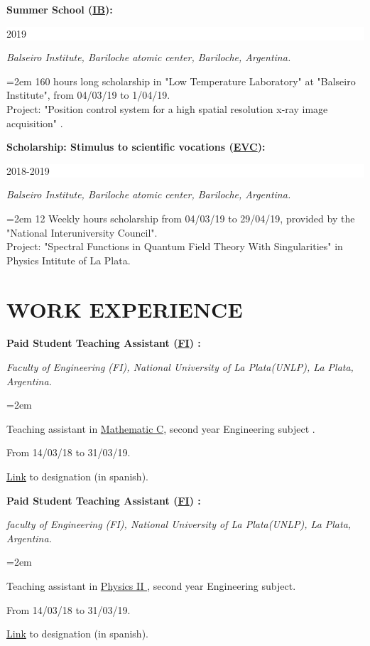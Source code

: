 \documentclass[paper=letter,fontsize=11pt]{scrartcl} %
\newcommand{\sepspace}{\vspace*{1em}}		%
\newcommand{\NewPart}[2]{\section*{\uppercase{#1} \small \normalfont #2}}
\newcommand{\EducationEntry}[4]{
		\noindent \textbf{#1} \hfill      %
		\colorbox{White}{%
			\parbox{6em}{%
			\hfill\color{Black}#2}} \par  %
		\noindent \textit{#3} \par        %
		\noindent\hangindent=2em\hangafter=0 \small #4 %
		\normalsize \par}
\newcommand{\WorkEntry}[5]{
		\noindent \textbf{#1}
        \noindent \small \textit{#2}
        \hfill      %
        \colorbox{White}{%
			\parbox{6em}{%
			\hfill\color{Black}#3}} \par  %
		\noindent \textit{#4} \par        %
		\noindent\hangindent=2em\hangafter=0 \small #5 %
		\normalsize \par}
\begin{document}
\sepspace

\EducationEntry{Summer School ({\href{http://www.ib.edu.ar/component/k2/item/452-becas-de-verano.html}{IB}}):}
{2019}
{Balseiro Institute, Bariloche atomic center, Bariloche, Argentina.}
{160 hours long scholarship in "Low Temperature Laboratory" at "Balseiro Institute", from 04/03/19 to 1/04/19. \\ 
Project: "Position control system for a high spatial resolution x-ray image acquisition" .
}

\sepspace

\EducationEntry{Scholarship: Stimulus to scientific vocations ({\href{http://evc.cin.edu.ar/}{EVC}}):}
{2018-2019}
{Balseiro Institute, Bariloche atomic center, Bariloche, Argentina.}
{12 Weekly hours scholarship from 04/03/19 to 29/04/19, provided by the "National Interuniversity Council". \\ 
Project: "Spectral Functions in Quantum Field Theory With Singularities" in Physics Intitute of La Plata.
}


\NewPart{Work Experience}{}

\sepspace

\WorkEntry{ Paid Student Teaching Assistant ({\href{https://www.ing.unlp.edu.ar/}{FI}}) :}{}{}{Faculty of Engineering (FI), National University of La Plata(UNLP), La Plata, Argentina.}{


Teaching assistant in {\href{https://www.ing.unlp.edu.ar/catedras/F0304/}{Mathematic C}, second year Engineering subject }.

From 14/03/18 to 31/03/19.

{\href{https://drive.google.com/drive/folders/1v960J-ofrC-xrrzCB4wOwtd4gdpVOSZy?usp=sharing}{Link} to designation (in spanish).}
}


\sepspace

\WorkEntry{ Paid Student Teaching Assistant ({\href{https://www.ing.unlp.edu.ar/}{FI}}) :}{}{}{faculty of Engineering (FI), National University of La Plata(UNLP), La Plata, Argentina.}{


Teaching assistant in {\href{https://www.ing.unlp.edu.ar/catedras/F0305/}{Physics II  }}, second year Engineering subject.

From 14/03/18 to 31/03/19.

\href{https://drive.google.com/drive/folders/1vABkaZMn7Y_dWg1AbqDlz4lgAiekRv09?usp=sharing}{Link} to designation (in spanish).
}

\sepspace
\end{document}

